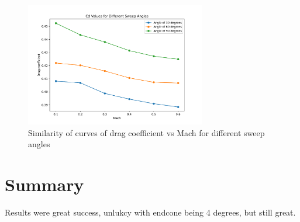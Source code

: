 \documentclass{article}
\begin{document}
\begin{figure}[H]
    \centering
    \includegraphics[width=0.7\textwidth]{../data/R6-Parametric-Fins/CDvsMach.pdf}
    \caption{Similarity of curves of drag coefficient vs Mach for different sweep angles}
\end{figure}

\section{Summary}
Results were great success, unlukcy with endcone being 4 degrees, but still great.
\end{document}
